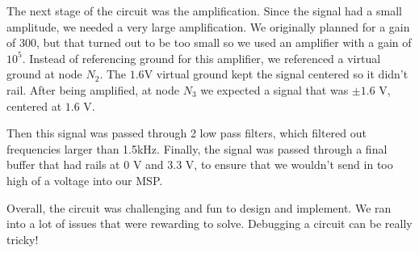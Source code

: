 \documentclass{article}
\begin{document}
The next stage of the circuit was the amplification. Since the signal had a
small amplitude, we needed a very large amplification. We originally planned
for a gain of $300$, but that turned out to be too small so we used an
amplifier with a gain of $10^{5}$. Instead of referencing ground for this
amplifier, we referenced a virtual ground at node $N_2$. The $1.6$V virtual
ground kept the signal centered so it didn't rail.  After being amplified, at
node $N_3$ we expected a signal that was $\pm 1.6$ V, centered at $1.6$ V.

Then this signal was passed through 2 low pass filters, which filtered out
frequencies larger than 1.5kHz. Finally, the signal was passed through a final
buffer that had rails at $0$ V and $3.3$ V, to ensure that we wouldn't send in
too high of a voltage into our MSP.

Overall, the circuit was challenging and fun to design and implement. We ran
into a lot of issues that were rewarding to solve. Debugging a circuit can be
really tricky!
\end{document}
